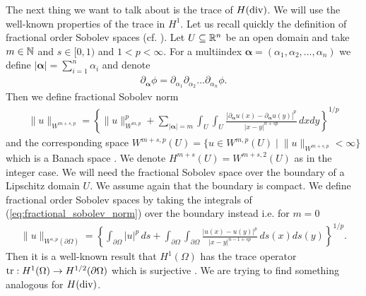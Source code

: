 \documentclass[../main.tex]{subfiles}
\begin{document}
The next thing we want to talk about is the trace of $H(\operatorname{div})$. 
We will use the well-known properties of the trace in $H^1$. 
Let us recall 
quickly the definition of fractional order Sobolev spaces (cf. \cite{}). Let 
$U \subseteq \mathbb{R}^n$ be an open domain and take $m \in \mathbb{N}$ and 
$s \in [0, 1)$ and $1 < p < \infty$. For a multiindex $\boldsymbol{\alpha} = 
(\alpha_1, \alpha_2, ..., \alpha_n)$ we define $|\boldsymbol{\alpha}| = \sum_{i=1}^n \alpha_i$ 
and denote 
\begin{align}
    \partial_{\bm{\alpha}} \phi = 
    \partial_{\alpha_1} \partial_{\alpha_2} \dots \partial_{\alpha_n} \phi.
\end{align}
Then we define fractional Sobolev norm
\begin{align}
    \lVert u \rVert _ {W^{m+s, p}} = \left\{ \lVert u \rVert ^p_{W^{m, p}} + 
        \sum_{|\bm{\alpha}|=m} \int_U \int_U 
        \frac{|\partial_{\bm{\alpha}} u(x) - \partial_{\bm{\alpha}} u(y)|^p}
        {|x - y|^{n+sp}} \, dx dy\right\}^{1/p}\label{eq:fractional_sobolev_norm}
\end{align}
and the corresponding space $W^{m+s, p}(U) = \{ u \in W^{m,p}(U) \mid \lVert u \rVert _{W^{m+s, p}} < \infty \}$ 
which is a Banach space \cite[p.42]{monk}. We denote 
$H^{m+s}(U) = W^{m+s, 2}(U)$ as in the integer case. We will need the 
fractional Sobolev space over the boundary of a Lipschitz domain $U$. We assume 
again that the boundary is compact.
We define fractional order Sobolev spaces by taking the integrals of (\ref{eq:fractional_sobolev_norm}) 
over the boundary instead i.e. for $m = 0$
\begin{align*}
    \lVert u \rVert _{W^{s, p}(\partial \Omega)} = \left\{ \int_{\partial\Omega} |u|^p \, ds + 
        \int_{\partial\Omega} \int_{\partial\Omega}
        \frac{|u(x) - u(y)|^p}
        {|x - y|^{n-1+sp}} \, ds(x) ds(y)\right\}^{1/p}.
\end{align*}
Then it 
is a well-known result that $H^1(\Omega)$ has the trace operator 
$\operatorname{tr}: H^1(\Omega) \rightarrow H^{1/2}(\partial \Omega)$ which is surjective \cite[p.28]{arnold}.
We are trying to find something analogous for $H(\operatorname{div})$.
\end{document}

